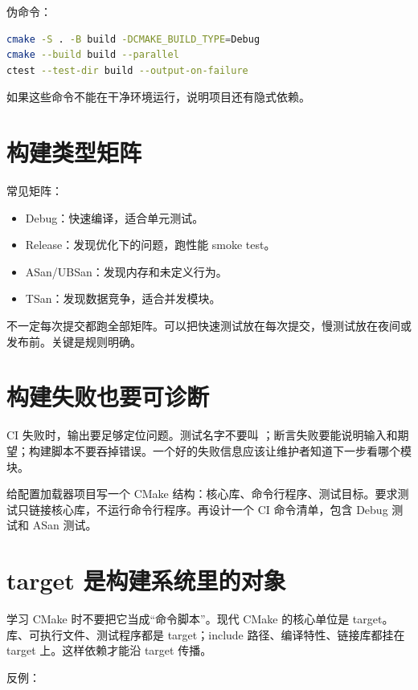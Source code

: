 伪命令：

\begin{lstlisting}[language=bash,caption={CI 核心命令}]
cmake -S . -B build -DCMAKE_BUILD_TYPE=Debug
cmake --build build --parallel
ctest --test-dir build --output-on-failure
\end{lstlisting}

如果这些命令不能在干净环境运行，说明项目还有隐式依赖。

\section{构建类型矩阵}

常见矩阵：

\begin{itemize}
  \item Debug：快速编译，适合单元测试。
  \item Release：发现优化下的问题，跑性能 smoke test。
  \item ASan/UBSan：发现内存和未定义行为。
  \item TSan：发现数据竞争，适合并发模块。
\end{itemize}

不一定每次提交都跑全部矩阵。可以把快速测试放在每次提交，慢测试放在夜间或发布前。关键是规则明确。

\section{构建失败也要可诊断}

CI 失败时，输出要足够定位问题。测试名字不要叫 ；断言失败要能说明输入和期望；构建脚本不要吞掉错误。一个好的失败信息应该让维护者知道下一步看哪个模块。

\begin{exercisebox}
给配置加载器项目写一个 CMake 结构：核心库、命令行程序、测试目标。要求测试只链接核心库，不运行命令行程序。再设计一个 CI 命令清单，包含 Debug 测试和 ASan 测试。
\end{exercisebox}

\section{target 是构建系统里的对象}

学习 CMake 时不要把它当成“命令脚本”。现代 CMake 的核心单位是 target。库、可执行文件、测试程序都是 target；include 路径、编译特性、链接库都挂在 target 上。这样依赖才能沿 target 传播。

反例：

